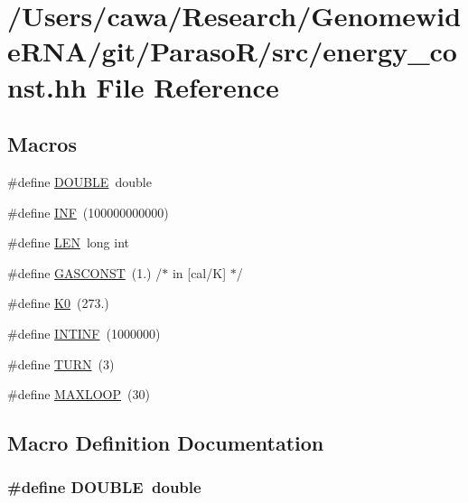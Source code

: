 \hypertarget{energy__const_8hh}{\section{/\+Users/cawa/\+Research/\+Genomewide\+R\+N\+A/git/\+Paraso\+R/src/energy\+\_\+const.hh File Reference}
\label{energy__const_8hh}
}
\subsection*{Macros}
\begin{DoxyCompactItemize}
\item 
\#define \hyperlink{energy__const_8hh_a8747af38b86aa2bbcda2f1b1aa0888c2}{D\+O\+U\+B\+L\+E}~double
\item 
\#define \hyperlink{energy__const_8hh_a12c2040f25d8e3a7b9e1c2024c618cb6}{I\+N\+F}~(100000000000)
\item 
\#define \hyperlink{energy__const_8hh_a05b49c662c073f89e86804f7856622a0}{L\+E\+N}~long int
\item 
\#define \hyperlink{energy__const_8hh_ab1e4a8d82f24ed5db01dde5f25269cf1}{G\+A\+S\+C\+O\+N\+S\+T}~(1.)  /$\ast$ in \mbox{[}cal/K\mbox{]} $\ast$/
\item 
\#define \hyperlink{energy__const_8hh_a307c72605e3713972b4f4fb2d53ea20e}{K0}~(273.)
\item 
\#define \hyperlink{energy__const_8hh_a0394650c03180f81bb6faa14a89201dc}{I\+N\+T\+I\+N\+F}~(1000000)
\item 
\#define \hyperlink{energy__const_8hh_ae646250fd59311356c7e5722a81c3a96}{T\+U\+R\+N}~(3)
\item 
\#define \hyperlink{energy__const_8hh_ad1bd6eabac419670ddd3c9ed82145988}{M\+A\+X\+L\+O\+O\+P}~(30)
\end{DoxyCompactItemize}


\subsection{Macro Definition Documentation}
\hypertarget{energy__const_8hh_a8747af38b86aa2bbcda2f1b1aa0888c2}{
\subsubsection[{D\+O\+U\+B\+L\+E}]{\setlength{\rightskip}{0pt plus 5cm}\#define D\+O\+U\+B\+L\+E~double}}\label{energy__const_8hh_a8747af38b86aa2bbcda2f1b1aa0888c2}


